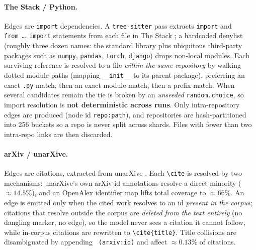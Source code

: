 \paragraph{The Stack / Python.}
Edges are \texttt{import} dependencies. A \texttt{tree-sitter} pass extracts
\texttt{import} and \texttt{from~\ldots~import} statements from each file in The
Stack \citep{kocetkov2022stack}; a hardcoded denylist (roughly three dozen names:
the standard library plus ubiquitous third-party packages such as \texttt{numpy},
\texttt{pandas}, \texttt{torch}, \texttt{django}) drops non-local modules. Each
surviving reference is resolved to a file \emph{within the same repository} by
walking dotted module paths (mapping \texttt{\_\_init\_\_} to its parent
package), preferring an exact \texttt{.py} match, then an exact module match,
then a prefix match. When several candidates remain the tie is broken by an
\emph{unseeded} \texttt{random.choice}, so import resolution is \textbf{not
deterministic across runs}. Only intra-repository edges are produced (node id
\texttt{repo:path}), and repositories are hash-partitioned into 256 buckets so a
repo is never split across shards. Files with fewer than two intra-repo links are
then discarded.

\paragraph{arXiv / unarXive.}
Edges are citations, extracted from unarXive \citep{saier2020unarxive,
saier2023unarxive}. Each \texttt{\textbackslash cite} is resolved by two
mechanisms: unarXive's own arXiv-id annotations resolve a direct minority
($\approx 14.5\%$), and an OpenAlex identifier map \citep{priem2022openalex}
lifts total coverage to $\approx 66\%$. An edge is emitted only when the cited
work resolves to an id \emph{present in the corpus}; citations that resolve
outside the corpus are \emph{deleted from the text entirely} (no dangling marker,
no edge), so the model never sees a citation it cannot follow, while in-corpus
citations are rewritten to \texttt{\textbackslash cite\{title\}}. Title
collisions are disambiguated by appending \texttt{ (arxiv:id)} and affect
$\approx 0.13\%$ of citations.


